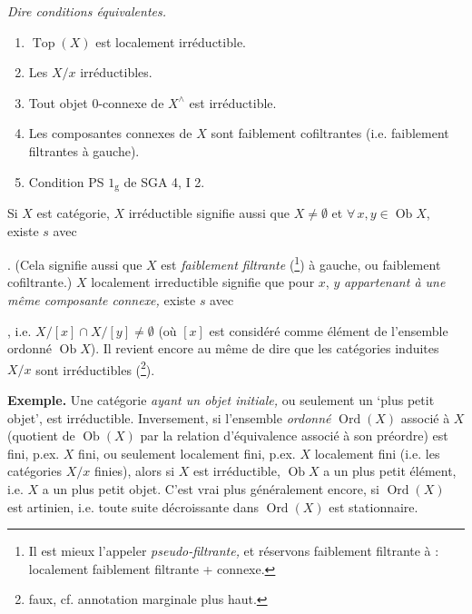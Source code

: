\textit{Dire conditions équivalentes.}
\begin{enumerate}
\item[a)] $\operatorname{Top}(X)$ est localement irréductible.
\item[b)] Les $X/x$ irréductibles.
\item[c)] Tout objet 0-connexe de $X^\wedge$ est irréductible.
\item[d)] Les composantes connexes de $X$ sont faiblement cofiltrantes (i.e. faiblement filtrantes à gauche).
\item[e)] Condition PS $1_{\mathrm{g}}$ de SGA 4, I 2.
\end{enumerate}
Si $X$ est catégorie, $X$ irréductible signifie aussi que $X \neq \emptyset$ et $\forall\, x, y \in \operatorname{Ob} X$, existe $s$ avec . (Cela signifie aussi que $X$ est \textit{faiblement filtrante} (\footnote[11]{Il est mieux l'appeler \textit{pseudo-filtrante,} et réservons faiblement filtrante à : localement faiblement filtrante + connexe.}) à gauche, ou faiblement cofiltrante.) $X$ localement irreductible signifie que pour $x$, $y$ \textit{appartenant à une même composante connexe,} existe $s$ avec , %
i.e. $X/[x] \cap X/[y] \neq \emptyset$ (où $[x]$ est considéré comme élément de l'ensemble ordonné $\operatorname{Ob} X$). Il revient encore au même de dire que les catégories induites $X/x$ sont irréductibles (\footnote[12]{faux, cf. annotation marginale plus haut.}).

\textbf{Exemple.} Une catégorie \textit{ayant un objet initiale,} ou seulement un `plus petit objet', est irréductible. Inversement, si l'ensemble \textit{ordonné} $\operatorname{Ord}(X)$ associé à $X$ (quotient de $\operatorname{Ob}(X)$ par la relation d'équivalence associé à son préordre) est fini, p.ex. $X$ fini, ou seulement localement fini, p.ex. $X$ localement fini (i.e. les catégories $X/x$ finies), alors si $X$ est irréductible, $\operatorname{Ob} X$ a un plus petit élément, i.e. $X$ a un plus petit objet. C'est vrai plus généralement encore, si $\operatorname{Ord}(X)$ est artinien, i.e. toute suite décroissante dans $\operatorname{Ord}(X)$ est stationnaire. %

